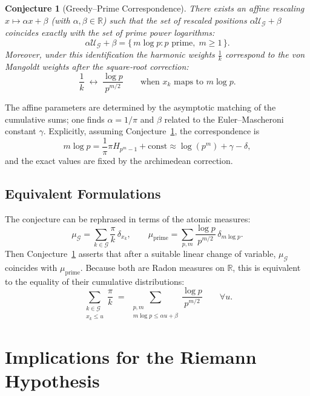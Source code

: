 \documentclass[12pt,a4paper,twoside,openright]{book}
\newtheorem{conjecture}[theorem]{Conjecture}
\newcommand{\R}{\mathbb{R}}
\begin{document}
\begin{conjecture}[Greedy--Prime Correspondence]\label{conj:GPC}
There exists an affine rescaling \(x \mapsto \alpha x + \beta\) (with \(\alpha,\beta\in\R\)) such that the set of rescaled positions \(\alpha\mathcal{U}_{\mathcal{G}} + \beta\) coincides exactly with the set of prime power logarithms:
\[
\alpha\mathcal{U}_{\mathcal{G}} + \beta = \{\, m\log p : p\text{ prime},\; m\ge 1 \,\}.
\]
Moreover, under this identification the harmonic weights \(\frac{1}{k}\) correspond to the von Mangoldt weights after the square‑root correction:
\[
\frac{1}{k} \;\longleftrightarrow\; \frac{\log p}{p^{m/2}} \qquad\text{when } x_k \text{ maps to } m\log p .
\]
\end{conjecture}

\noindent The affine parameters are determined by the asymptotic matching of the cumulative sums; one finds \(\alpha = 1/\pi\) and \(\beta\) related to the Euler–Mascheroni constant \(\gamma\).  Explicitly, assuming Conjecture~\ref{conj:GPC}, the correspondence is
\[
m\log p = \frac{1}{\pi} \pi H_{p^m-1} + \text{const} \approx \log(p^m) + \gamma - \delta,
\]
and the exact values are fixed by the archimedean correction.

\section{Equivalent Formulations}
The conjecture can be rephrased in terms of the atomic measures:
\[
\mu_{\mathcal{G}} = \sum_{k\in\mathcal{G}} \frac{\pi}{k} \, \delta_{x_k},\qquad
\mu_{\text{prime}} = \sum_{p,m} \frac{\log p}{p^{m/2}} \, \delta_{m\log p}.
\]
Then Conjecture~\ref{conj:GPC} asserts that after a suitable linear change of variable, \(\mu_{\mathcal{G}}\) coincides with \(\mu_{\text{prime}}\).  Because both are Radon measures on \(\R\), this is equivalent to the equality of their cumulative distributions:
\[
\sum_{\substack{k\in\mathcal{G}\\ x_k \le u}} \frac{\pi}{k} \;=\; \sum_{\substack{p,m\\ m\log p \le \alpha u + \beta}} \frac{\log p}{p^{m/2}} \qquad \forall u.
\]

\chapter{Implications for the Riemann Hypothesis}
\end{document}
